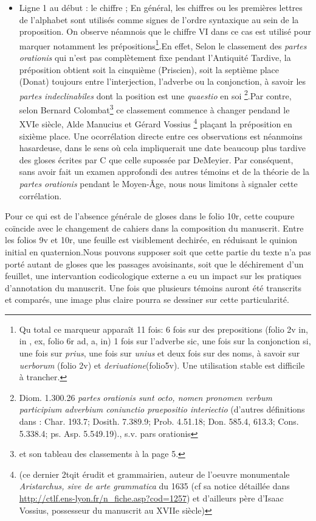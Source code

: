 \documentclass[a4paper, twoside, 12pt]{book}
\begin{document}
\begin{itemize}
    \item Ligne 1 au début : le chiffre   ; En général, les chiffres ou les premières lettres de l'alphabet sont utilisés comme signes de l'ordre syntaxique au sein de la proposition. On observe néamnois que le chiffre VI dans ce cas est utilisé pour marquer notamment les prépositions\footnote{Qu total ce marqueur apparaît 11 fois: 6 fois sur des prepositions (folio 2v in, in , ex, folio 6r ad, a, in) 1 fois sur l'adverbe sic, une fois sur la conjonction si, une fois sur \textit{prius}, une fois sur \textit{unius} et deux fois sur des noms, à savoir sur \textit{uerborum} (folio 2v) et \textit{deriuatione}(folio5v). Une utilisation stable est difficile à trancher.}.En effet, Selon le classement des \textit{partes orationis} qui n'est pas complètement fixe pendant l'Antiquité Tardive, la préposition obtient soit la cinquième (Priscien), soit la septième place (Donat) toujours entre l'interjection, l'adverbe ou la conjonction, à savoir les \textit{partes indeclinabiles} dont la position est une \textit{quaestio} en soi \footnote{Diom. 1.300.26 \textit{partes orationis sunt octo, nomen pronomen verbum participium adverbium coniunctio praepositio interiectio} (d'autres définitions dans : Char. 193.7; Dosith. 7.389.9; Prob. 4.51.18; Don. 585.4, 613.3; Cons. 5.338.4; ps. Asp. 5.549.19).\cite{schad2007lexicon}, s.v.\og{} pars orationis \fg{}}.Par contre, selon Bernard Colombat\footnote{\cite{colombat1988parties} et son tableau des classements à la page 5.} ce classement commence à changer pendand le XVIe siècle, Alde Manucius et Gérard Vossius \footnote{(ce dernier 2tqit érudit et grammairien, auteur de l'oeuvre monumentale \textit{Aristarchus, sive de arte grammatica} du 1635 (cf sa notice détaillée dans \url{http://ctlf.ens-lyon.fr/n_fiche.asp?cod=1257}) et d'ailleurs père d'Isaac Vossius, possesseur du manuscrit au XVIIe siècle)} plaçant la préposition en sixième place. Une ocorrélation directe entre ces observations est néanmoins hasardeuse, dans le sens où cela impliquerait une date beaucoup plus tardive des gloses écrites par C que celle supossée par DeMeyier. Par conséquent, sans avoir fait un examen approfondi des autres témoins et de la théorie de la \textit{partes orationis} pendant le Moyen-Âge, nous nous limitons à signaler cette corrélation. 
   
\end{itemize}

Pour ce qui est de l'absence générale de gloses dans le folio 10r, cette coupure coïncide avec le changement de cahiers dans la composition du manuscrit. Entre les folios 9v et 10r, une feuille est visiblement dechirée, en réduisant le quinion initial en quaternion.Nous pouvons supposer soit que cette partie du texte n'a pas porté autant de gloses que les passages avoisinants, soit que le déchirement d'un feuillet, une intervantion codicologique externe a eu un impact sur les pratiques d'annotation du manuscrit. Une fois que plusieurs témoins auront été transcrits et comparés, une image plus claire pourra se dessiner sur cette particularité.
\end{document}
